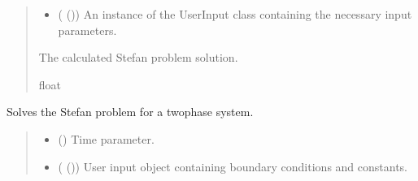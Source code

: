 \documentclass[a4paper,11pt,english,openany]{sphinxmanual}
\begin{document}
\begin{fulllineitems}
\begin{fulllineitems}
\begin{quote}
\begin{description}
\begin{itemize}
\item {} 
\sphinxAtStartPar
{} ({\hyperref[\detokenize{api/spyice.parameters.user_input:spyice.parameters.user_input.UserInput}]{}} ()) \textendash{} An instance of the UserInput class containing the necessary input parameters.

\end{itemize}

\sphinxAtStartPar
The calculated Stefan problem solution.

\sphinxAtStartPar
float

\sphinxAtStartPar
{} \textendash{} 

\end{description}\end{quote}

\end{fulllineitems}


\begin{fulllineitems}
\label{\detokenize{api/spyice.models.stefan_problem:spyice.models.stefan_problem.StefanProblem.stefan_problem_twophase}}
\pysigstartsignatures
{}
\pysigstopsignatures
\sphinxAtStartPar
Solves the Stefan problem for a two\sphinxhyphen{}phase system.
\begin{quote}\begin{description}
\begin{itemize}
\item {} 
\sphinxAtStartPar
{} () \textendash{} Time parameter.

\item {} 
\sphinxAtStartPar
{} ({\hyperref[\detokenize{api/spyice.parameters.user_input:spyice.parameters.user_input.UserInput}]{}} ()) \textendash{} User input object containing boundary conditions and constants.


\end{itemize}
\end{description}
\end{quote}
\end{fulllineitems}
\end{fulllineitems}
\end{document}
